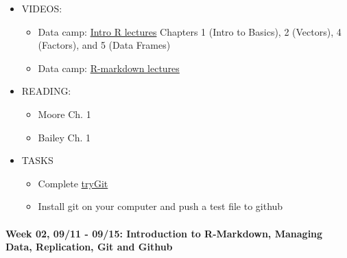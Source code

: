 \documentclass[11pt,]{article}
\providecommand{\tightlist}{%
  \setlength{\itemsep}{0pt}\setlength{\parskip}{0pt}}
\begin{document}
\begin{itemize}
\tightlist
\item
  VIDEOS:

  \begin{itemize}
  \tightlist
  \item
    Data camp:
    \href{https://www.datacamp.com/courses/free-introduction-to-r-beta}{Intro
    R lectures} Chapters 1 (Intro to Basics), 2 (Vectors), 4 (Factors),
    and 5 (Data Frames)
  \item
    Data camp:
    \href{https://www.datacamp.com/courses/reporting-with-r-markdown}{R-markdown
    lectures}
  \end{itemize}
\item
  READING:

  \begin{itemize}
  \tightlist
  \item
    Moore Ch. 1
  \item
    Bailey Ch. 1
  \end{itemize}
\item
  TASKS

  \begin{itemize}
  \tightlist
  \item
    Complete \href{https://try.github.io/levels/1/challenges/1}{tryGit}
  \item
    Install git on your computer and push a test file to github
  \end{itemize}
\end{itemize}

\paragraph{Week 02, 09/11 - 09/15: Introduction to R-Markdown, Managing
Data, Replication, Git and
Github}\label{week-02-0911---0915-introduction-to-r-markdown-managing-data-replication-git-and-github}
\end{document}
